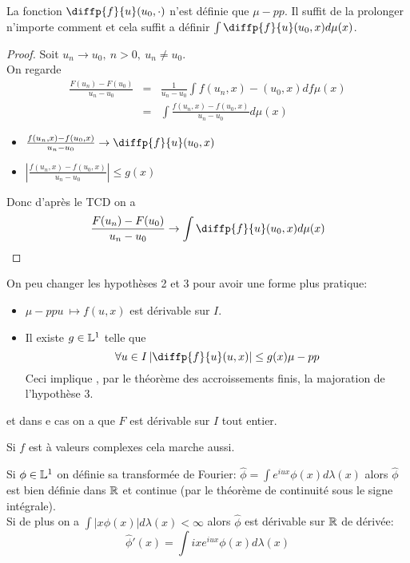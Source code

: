 \begin{remarque}
	La fonction $\diffp{f}{u}(u_0,\cdot)$ n'est définie que $\mu-pp$. Il suffit de
	la prolonger n'importe comment et cela suffit a définir $\int \diffp{f}{u}(u_0,x)d\mu(x)$.
\end{remarque}

\begin{proof}
	Soit $u_n \to u_0, \ n > 0, \ u_n \neq u_0$. \\
	On regarde
	\begin{eqnarray*}
		\frac{F(u_n)-F(u_0)}{u_n-u_0} &=& \frac{1}{u_n-u_0} \int f(u_n,x) -(u_0,x)df\mu(x) \\
		&=& \int \frac{f(u_n,x) - f(u_0,x)}{u_n-u_0}d\mu(x)
	\end{eqnarray*}
	\begin{itemize}
		\item $\frac{f(u_n,x)- f(u_0,x)}{u_n-u_0} \to \diffp{f}{u}(u_0,x)$
		\item $\left|\frac{f(u_n,x)- f(u_0,x)}{u_n-u_0} \right| \leq g(x)$
	\end{itemize}
	Donc d'après le TCD on a %
	$$ \frac{F(u_n)- F(u_0)}{u_n-u_0} \to \int \diffp{f}{u}(u_0,x) d\mu(x)$$

\end{proof}

\begin{remarque}
	On peu changer les hypothèses 2 et 3 pour avoir une forme plus pratique:
	\begin{itemize}
		\item $\mu-pp u \ \mapsto f(u,x)$ est dérivable sur $I$.
		\item Il existe $g\in \mathbb{L}^1$ telle que
		      $$ \forall u\in I \left|\diffp{f}{u}(u,x)\right| \leq g(x) \mu-pp$$
		      Ceci implique , par le théorème des accroissements finis, la majoration de l'hypothèse 3.
	\end{itemize}
	et dans e cas on a que $F$ est dérivable sur $I$ tout entier.
\end{remarque}

\begin{remarque}
	Si $f$ est à valeurs complexes cela marche aussi.
\end{remarque}


\begin{example}
	Si $\phi \in \mathbb{L}^1$ on définie sa transformée de Fourier:
	$\hat{\phi} = \int e^{iux}\phi(x) d\lambda(x)$
	alors $\hat{\phi}$ est bien définie dans $\mathbb{R}$ et continue (par le théorème de continuité sous le signe intégrale).\\
	Si de plus on a $\int |x\phi(x)|d\lambda(x)<\infty$ alors $\hat{\phi}$ est dérivable sur $\mathbb{R}$ de dérivée:
	$$\hat{\phi}'(x)= \int ixe^{iux}\phi(x)d\lambda(x)$$
\end{example}



